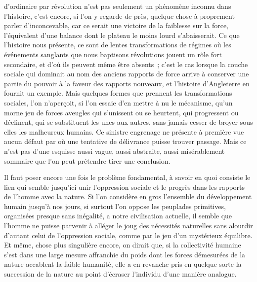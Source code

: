 \documentclass[french,twoside]{book} %
\begin{document}
d'ordinaire par révolution n'est pas seulement un phénomène inconnu dans l'histoire, c'est encore, si l'on y regarde de près, quelque chose à proprement parler d'inconcevable, car ce serait une victoire de la faiblesse sur la force, l'équivalent d'une balance dont le plateau le moins lourd s'abaisserait. Ce que l'histoire nous présente, ce sont de lentes transformations de régimes où les événements sanglants que nous baptisons révolutions jouent un rôle fort secondaire, et d'où ils peuvent même être absents ; c'est le cas lorsque la couche sociale qui dominait au nom des anciens rapports de force arrive à conserver une partie du pouvoir à la faveur des rapports nouveaux, et l'histoire d'Angleterre en fournit un exemple. Mais quelques formes que prennent les transformations sociales, l'on n'aperçoit, si l'on essaie d'en mettre à nu le mécanisme, qu'un morne jeu de forces aveugles qui s'unissent ou se heurtent, qui progressent ou déclinent, qui se substituent les unes aux autres, sans jamais cesser de broyer sous elles les malheureux humains. Ce sinistre engrenage ne présente à première vue aucun défaut par où une tentative de délivrance puisse trouver passage. Mais ce n'est pas d'une esquisse aussi vague, aussi abstraite, aussi misérablement sommaire que l'on peut prétendre tirer une conclusion.\par
Il faut poser encore une fois le problème fondamental, à savoir en quoi consiste le lien qui semble jusqu'ici unir l'oppression sociale et le progrès dans les rapports de l'homme avec la nature. Si l'on considère en gros l'ensemble du développement humain jusqu'à nos jours, si surtout l'on oppose les peuplades primitives, organisées presque sans inégalité, a notre civilisation actuelle, il semble que l'homme ne puisse parvenir à alléger le joug des nécessités naturelles sans alourdir d'autant celui de l'oppression sociale, comme par le jeu d'un mystérieux équilibre. Et même, chose plus singulière encore, on dirait que, si la collectivité humaine s'est dans une large mesure affranchie du poids dont les forces démesurées de la nature accablent la faible humanité, elle a en revanche pris en quelque sorte la succession de la nature au point d'écraser l'individu d'une manière analogue.\par
\end{document}
